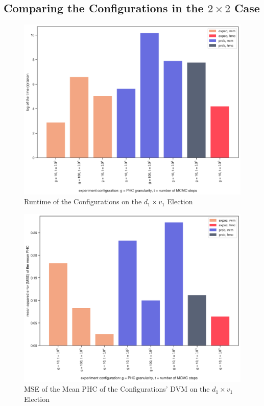 \FloatBarrier
\subsection{Comparing the Configurations in the $2 \times 2$ Case}
\label{subsec:comp_config_2x2}

\begin{figure}[ht]\centering
 \includegraphics[width=\linewidth]{figures/1_1_time.png}
 \caption{Runtime of the Configurations on the $d_1 \times v_1$ Election}
 \label{fig:1_1_time}
\end{figure}

\begin{figure}[ht]\centering
 \includegraphics[width=\linewidth]{figures/1_1_mean_mse.png}
 \caption{MSE of the Mean PHC of the Configurations' DVM on the $d_1 \times v_1$ Election}
 \label{fig:1_1_mean_mse}
\end{figure}


